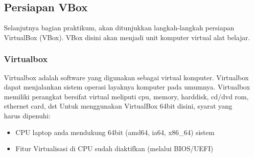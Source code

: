 \documentclass[12pt,]{article}
\begin{document}
	\subsection{Persiapan VBox}
	Selanjutnya bagian praktikum, akan ditunjukkan langkah-langkah persiapan VirtualBox (VBox).
	VBox disini akan menjadi unit komputer virtual alat belajar.
	
	\subsubsection{Virtualbox}
	Virtualbox adalah software yang digunakan sebagai virtual komputer.
	Virtualbox dapat menjalankan sistem operasi layaknya komputer pada umumnya.
	Virtualbox memiliki perangkat bersifat virtual meliputi cpu, memory, harddisk, cd/dvd rom, ethernet card, dst
	Untuk menggunakan VirtualBox 64bit disini, syarat yang harus dipenuhi:
	\begin{itemize}
		\item CPU laptop anda mendukung 64bit (amd64, ia64, x86\_64) sistem
		\item Fitur Virtualisasi di CPU sudah diaktifkan (melalui BIOS/UEFI)
	\end{itemize}
	
\end{document}
